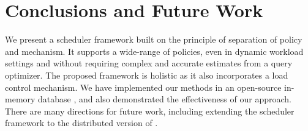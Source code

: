 \section{Conclusions and Future Work}\label{sec:conclusion}
We present a scheduler framework built on the principle of separation of policy and mechanism. 
It supports a wide-range of policies, even in dynamic workload settings and without requiring complex and accurate estimates from a query optimizer. 
The proposed framework is holistic as it also incorporates a load control mechanism. 
We have implemented our methods in an open-source in-memory database \sys{}, and also demonstrated the effectiveness of our approach.
There are many directions for future work, including extending the scheduler framework to the distributed version of \sys{}. %